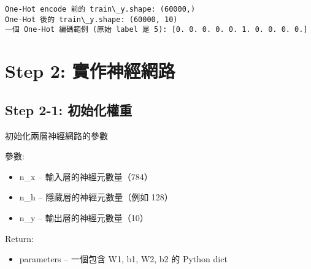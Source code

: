\documentclass[11pt]{article}
\providecommand{\tightlist}{%
      \setlength{\itemsep}{0pt}\setlength{\parskip}{0pt}}
\begin{document}
    \begin{Verbatim}[commandchars=\\\{\}]
One-Hot encode 前的 train\_y.shape: (60000,)
One-Hot 後的 train\_y.shape: (60000, 10)
一個 One-Hot 編碼範例 (原始 label 是 5): [0. 0. 0. 0. 0. 1. 0. 0. 0. 0.]
    \end{Verbatim}

    \section{Step 2:
實作神經網路}\label{step-2-ux5be6ux4f5cux795eux7d93ux7db2ux8def}

    \subsection{Step 2-1:
初始化權重}\label{step-2-1-ux521dux59cbux5316ux6b0aux91cd}

初始化兩層神經網路的參數

參數:

\begin{itemize}
\tightlist
\item
  n\_x -- 輸入層的神經元數量（784）
\item
  n\_h -- 隱藏層的神經元數量（例如 128）
\item
  n\_y -- 輸出層的神經元數量（10）
\end{itemize}

Return:

\begin{itemize}
\tightlist
\item
  parameters -- 一個包含 W1, b1, W2, b2 的 Python dict
\end{itemize}
\end{document}
